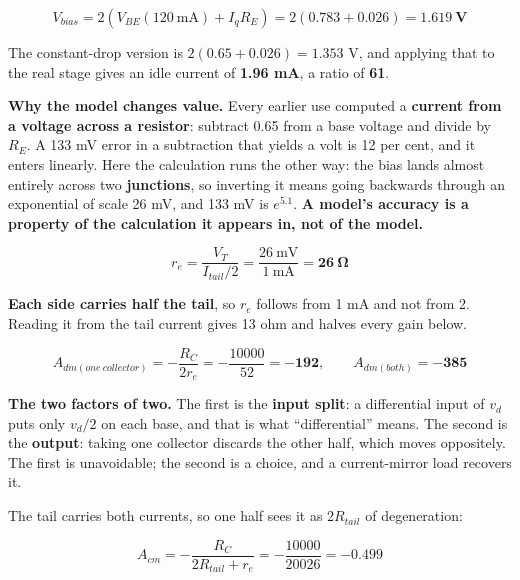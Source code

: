 \[
  V_{bias} = 2\left(V_{BE}(120\ \text{mA}) + I_q R_E\right) = 2(0.783 + 0.026)
  = \mathbf{1.619\ \text{V}}
\]

The constant-drop version is $2(0.65 + 0.026) = 1.353$ V, and applying that to the real stage gives an idle current of \textbf{1.96 mA}, a ratio of \textbf{61}.

\textbf{Why the model changes value.} Every earlier use computed a \textbf{current from a voltage across a resistor}: subtract 0.65 from a base voltage and divide by $R_E$. A 133 mV error in a subtraction that yields a volt is 12 per cent, and it enters linearly. Here the calculation runs the other way: the bias lands almost entirely across two \textbf{junctions}, so inverting it means going backwards through an exponential of scale 26 mV, and 133 mV is $e^{5.1}$. \textbf{A model's accuracy is a property of the calculation it appears in, not of the model.}



\[
  r_e = \frac{V_T}{I_{tail}/2} = \frac{26\ \text{mV}}{1\ \text{mA}} = \mathbf{26\ \Omega}
\]

\textbf{Each side carries half the tail}, so $r_e$ follows from 1 mA and not from 2. Reading it from the tail current gives 13 ohm and halves every gain below.

\[
  A_{dm(one\ collector)} = -\frac{R_C}{2r_e} = -\frac{10000}{52} = \mathbf{-192},
  \qquad A_{dm(both)} = \mathbf{-385}
\]

\textbf{The two factors of two.} The first is the \textbf{input split}: a differential input of $v_d$ puts only $v_d/2$ on each base, and that is what ``differential'' means. The second is the \textbf{output}: taking one collector discards the other half, which moves oppositely. The first is unavoidable; the second is a choice, and a current-mirror load recovers it.


The tail carries both currents, so one half sees it as $2R_{tail}$ of degeneration:

\[
  A_{cm} = -\frac{R_C}{2R_{tail} + r_e} = -\frac{10000}{20026} = \mathbf{-0.499}
\]

